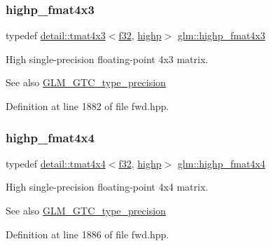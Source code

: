 \subsubsection{\texorpdfstring{highp\+\_\+fmat4x3}{highp\_fmat4x3}}
{\footnotesize\ttfamily typedef \hyperlink{structglm_1_1detail_1_1tmat4x3}{detail\+::tmat4x3}$<$\hyperlink{group__gtc__type__precision_ga0ec999b57f5330d9021256e96038df04}{f32}, \hyperlink{namespaceglm_a0f04f086094c747d227af4425893f545ac6f7eab42eacbb10d59a58e95e362074}{highp}$>$ \hyperlink{group__gtc__type__precision_ga07f7578fc5a4dd8cdd8a532db25d535f}{glm\+::highp\+\_\+fmat4x3}}

High single-\/precision floating-\/point 4x3 matrix. \begin{DoxySeeAlso}{See also}
\hyperlink{group__gtc__type__precision}{G\+L\+M\+\_\+\+G\+T\+C\+\_\+type\+\_\+precision} 
\end{DoxySeeAlso}


Definition at line 1882 of file fwd.\+hpp.

\mbox{\label{group__gtc__type__precision_gaf0a98d6caffce89da963d3430e05ddb0}} 
\subsubsection{\texorpdfstring{highp\+\_\+fmat4x4}{highp\_fmat4x4}}
{\footnotesize\ttfamily typedef \hyperlink{structglm_1_1detail_1_1tmat4x4}{detail\+::tmat4x4}$<$\hyperlink{group__gtc__type__precision_ga0ec999b57f5330d9021256e96038df04}{f32}, \hyperlink{namespaceglm_a0f04f086094c747d227af4425893f545ac6f7eab42eacbb10d59a58e95e362074}{highp}$>$ \hyperlink{group__gtc__type__precision_gaf0a98d6caffce89da963d3430e05ddb0}{glm\+::highp\+\_\+fmat4x4}}

High single-\/precision floating-\/point 4x4 matrix. \begin{DoxySeeAlso}{See also}
\hyperlink{group__gtc__type__precision}{G\+L\+M\+\_\+\+G\+T\+C\+\_\+type\+\_\+precision} 
\end{DoxySeeAlso}


Definition at line 1886 of file fwd.\+hpp.

\mbox{\label{group__gtc__type__precision_ga5d9f2208253856df60a57925f92ff0c8}} 
